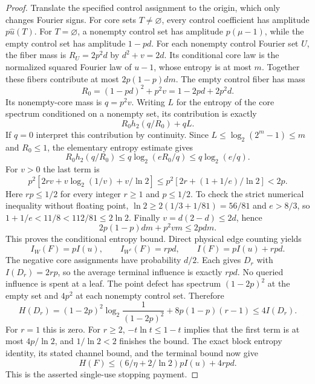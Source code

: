 \documentclass{article}
\begin{document}
\begin{proof}
Translate the specified control assignment to the origin, which only changes Fourier signs. For core sets $T\ne\varnothing$, every control coefficient has amplitude $p\widehat u(T)$. For $T=\varnothing$, a nonempty control set has amplitude $p(\mu-1)$, while the empty control set has amplitude $1-pd$.
For each nonempty control Fourier set $U$, the fiber mass is $R_U=2p^2d$ by $d^2+v=2d$. Its conditional core law is the normalized squared Fourier law of $u-1$, whose entropy is at most $m$. Together these fibers contribute at most $2p(1-p)dm$.
The empty control fiber has mass
\[R_0=(1-pd)^2+p^2v=1-2pd+2p^2d.\]
Its nonempty-core mass is $q=p^2v$. Writing $L$ for the entropy of the core spectrum conditioned on a nonempty set, its contribution is exactly
\[R_0h_2(q/R_0)+qL.\]
If $q=0$ interpret this contribution by continuity. Since $L\le\log_2(2^m-1)\le m$ and $R_0\le1$, the elementary entropy estimate gives
\[R_0h_2(q/R_0)\le q\log_2(eR_0/q)\le q\log_2(e/q).\]
For $v>0$ the last term is
\[p^2[2rv+v\log_2(1/v)+v/\ln2]
\le p^2[2r+(1+1/e)/\ln2]<2p.\]
Here $rp\le1/2$ for every integer $r\ge1$ and $p\le1/2$. To check the strict numerical inequality without floating point, $\ln2\ge2(1/3+1/81)=56/81$ and $e>8/3$, so $1+1/e<11/8<112/81\le2\ln2$.
Finally $v=d(2-d)\le2d$, hence
\[2p(1-p)dm+p^2vm\le2pdm.\]
This proves the conditional entropy bound.
Direct physical edge counting yields
\[I_W(F)=pI(u),\qquad I_{W^c}(F)=rpd,\qquad I(F)=pI(u)+rpd.\]
The negative core assignments have probability $d/2$. Each gives $D_r$ with $I(D_r)=2rp$, so the average terminal influence is exactly $rpd$. No queried influence is spent at a leaf.
The point defect has spectrum $(1-2p)^2$ at the empty set and $4p^2$ at each nonempty control set. Therefore
\[H(D_r)=(1-2p)^2\log_2\frac1{(1-2p)^2}+8p(1-p)(r-1)\le4I(D_r).\]
For $r=1$ this is zero. For $r\ge2$, $-t\ln t\le1-t$ implies that the first term is at most $4p/\ln2$, and $1/\ln2<2$ finishes the bound. The exact block entropy identity, its stated channel bound, and the terminal bound now give
\[H(F)\le(6/\eta+2/\ln2)pI(u)+4rpd.\]
This is the asserted single-use stopping payment.
\end{proof}
\end{document}
